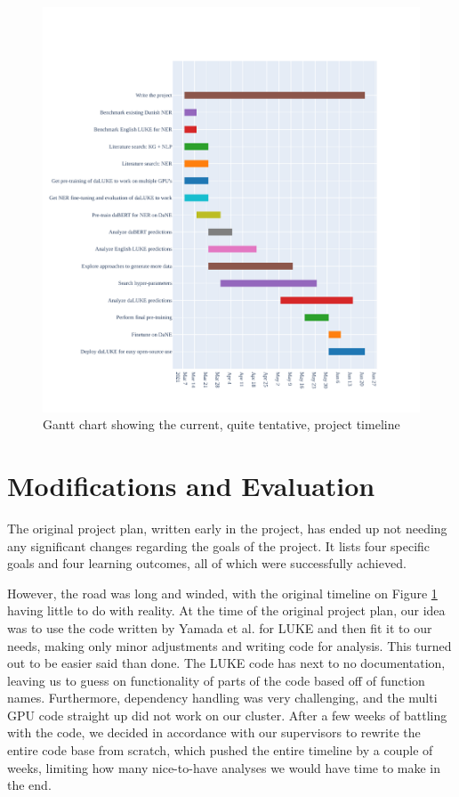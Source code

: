 \documentclass[12pt,fleqn]{article}
\begin{document}
\begin{figure}[H]
    \centering
        \includegraphics[width=\linewidth]{gantt}
        \caption{Gantt chart showing the current, quite tentative, project timeline}
    \label{fig:gantt}
\end{figure}\noindent

\section{Modifications and Evaluation}
The original project plan, written early in the project, has ended up not needing any significant changes regarding the goals of the project.
It lists four specific goals and four learning outcomes, all of which were successfully achieved.

However, the road was long and winded, with the original timeline on Figure \ref{fig:gantt} having little to do with reality.
At the time of the original project plan, our idea was to use the code written by Yamada et al. for LUKE and then fit it to our needs, making only minor adjustments and writing code for analysis.
This turned out to be easier said than done.
The LUKE code has next to no documentation, leaving us to guess on functionality of parts of the code based off of function names.
Furthermore, dependency handling was very challenging, and the multi GPU code straight up did not work on our cluster.
After a few weeks of battling with the code, we decided in accordance with our supervisors to rewrite the entire code base from scratch, which pushed the entire timeline by a couple of weeks, limiting how many nice-to-have analyses we would have time to make in the end.
\end{document}

